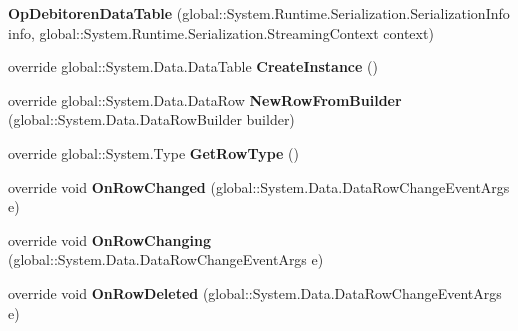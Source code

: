 \begin{DoxyCompactItemize}
\item 
{\bfseries Op\+Debitoren\+Data\+Table} (global\+::\+System.\+Runtime.\+Serialization.\+Serialization\+Info info, global\+::\+System.\+Runtime.\+Serialization.\+Streaming\+Context context)\hypertarget{class_products_1_1_data_1_1ds_sage_1_1_op_debitoren_data_table_a475299cc3a6850a44051e0ff342cc267}{}\label{class_products_1_1_data_1_1ds_sage_1_1_op_debitoren_data_table_a475299cc3a6850a44051e0ff342cc267}

\item 
override global\+::\+System.\+Data.\+Data\+Table {\bfseries Create\+Instance} ()\hypertarget{class_products_1_1_data_1_1ds_sage_1_1_op_debitoren_data_table_aa89b83cbcea668f36dafcea41845b4e2}{}\label{class_products_1_1_data_1_1ds_sage_1_1_op_debitoren_data_table_aa89b83cbcea668f36dafcea41845b4e2}

\item 
override global\+::\+System.\+Data.\+Data\+Row {\bfseries New\+Row\+From\+Builder} (global\+::\+System.\+Data.\+Data\+Row\+Builder builder)\hypertarget{class_products_1_1_data_1_1ds_sage_1_1_op_debitoren_data_table_af62fa2547afa829815a860e0e8b9ea01}{}\label{class_products_1_1_data_1_1ds_sage_1_1_op_debitoren_data_table_af62fa2547afa829815a860e0e8b9ea01}

\item 
override global\+::\+System.\+Type {\bfseries Get\+Row\+Type} ()\hypertarget{class_products_1_1_data_1_1ds_sage_1_1_op_debitoren_data_table_adb8bd45e5bef97664e5e500078a545e3}{}\label{class_products_1_1_data_1_1ds_sage_1_1_op_debitoren_data_table_adb8bd45e5bef97664e5e500078a545e3}

\item 
override void {\bfseries On\+Row\+Changed} (global\+::\+System.\+Data.\+Data\+Row\+Change\+Event\+Args e)\hypertarget{class_products_1_1_data_1_1ds_sage_1_1_op_debitoren_data_table_a30faa046d4e84f03148ed6d837e9ac91}{}\label{class_products_1_1_data_1_1ds_sage_1_1_op_debitoren_data_table_a30faa046d4e84f03148ed6d837e9ac91}

\item 
override void {\bfseries On\+Row\+Changing} (global\+::\+System.\+Data.\+Data\+Row\+Change\+Event\+Args e)\hypertarget{class_products_1_1_data_1_1ds_sage_1_1_op_debitoren_data_table_ac63e9a0a9f4bf6723b1eefa54e610897}{}\label{class_products_1_1_data_1_1ds_sage_1_1_op_debitoren_data_table_ac63e9a0a9f4bf6723b1eefa54e610897}

\item 
override void {\bfseries On\+Row\+Deleted} (global\+::\+System.\+Data.\+Data\+Row\+Change\+Event\+Args e)\hypertarget{class_products_1_1_data_1_1ds_sage_1_1_op_debitoren_data_table_aa907025b481b1558f06acde4c6d77de9}{}\label{class_products_1_1_data_1_1ds_sage_1_1_op_debitoren_data_table_aa907025b481b1558f06acde4c6d77de9}


\end{DoxyCompactItemize}
